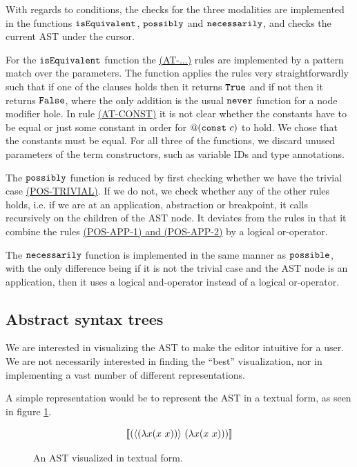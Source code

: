 With regards to conditions, the checks for the three modalities are implemented
in the functions $\texttt{isEquivalent}$, $\texttt{possibly}$ and $\texttt{necessarily}$,
and checks the current AST under the cursor.

For the $\texttt{isEquivalent}$ function the
\hyperref[fig:conditionreductionrules]{(AT-...)} rules are implemented by a
pattern match over the parameters.
The function applies the rules very straightforwardly such that if one of the
clauses holds then it returns $\texttt{True}$ and if not then it returns
$\texttt{False}$, where the only addition is the usual $\texttt{never}$ function
for a node modifier hole. In rule
\hyperref[fig:conditionreductionrules]{(AT-CONST)} it is not clear whether the
constants have to be equal or just some constant in order for $@(\texttt{const}~c)$ to
hold. We chose that the constants must be equal.
For all three of the functions, we discard unused parameters of the term
constructors, such as variable IDs and type annotations.

The $\texttt{possibly}$ function is reduced by first checking whether we have the
trivial case \hyperref[fig:conditionreductionrules]{(POS-TRIVIAL)}. If we do
not, we check whether any of the other rules holds, i.e. if we are at an
application, abstraction or breakpoint, it calls recursively on the children of
the AST node. It deviates from the rules in that it combine the rules
\hyperref[fig:conditionreductionrules]{(POS-APP-1) and (POS-APP-2)} by a logical
or-operator.

The $\texttt{necessarily}$ function is implemented in the same manner as
$\texttt{possible}$, with the only difference being if it is not the trivial case
and the AST node is an application, then it uses a logical and-operator instead
of a logical or-operator.


\subsection{Abstract syntax trees}

We are interested in visualizing the AST to make the editor intuitive
for a user.  We are not necessarily interested in finding the ``best''
visualization, nor in implementing a vast number of different
representations.

A simple representation would be to represent the AST in a textual form,
as seen in figure \ref{fig:ast-in-text-form}.

\begin{figure}[H]
  \Large
  \begin{equation*}
    \llbracket (\langle (\lambda{x}{(x~x)}) \rangle~(\lambda{x}{(x~x)})) \rrbracket
  \end{equation*}
  \caption{An AST visualized in textual form.}
  \label{fig:ast-in-text-form}
\end{figure}


